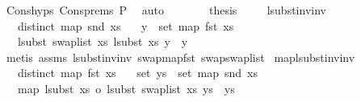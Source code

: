\begin{isabellebody}
\ Cons{\isachardot}{\kern0pt}hyps\ Cons{\isachardot}{\kern0pt}prems{\isacharparenleft}{\kern0pt}{}{\isacharparenright}{\kern0pt}\ P{}\ \isamarkupfalse%
\ auto\isanewline
\ \ \ \ \isamarkupfalse%
\ \isamarkupfalse%
\ {\isacharquery}{\kern0pt}thesis\ \isakeywordONE{{\isachardot}{\kern0pt}}\isamarkupfalse%
\isanewline
\ \ \isamarkupfalse%
\isanewline
{}\isamarkupfalse%
%
\endisatagproof
{\isafoldproof}%
%
\isadelimproof
\isanewline
%
\endisadelimproof
\isanewline
{}\isamarkupfalse%
\ lsubst{\isacharunderscore}{\kern0pt}inv{\isacharunderscore}{\kern0pt}inv{}{\isacharcolon}{\kern0pt}\isanewline
\ \ \ {\isachardoublequoteopen}distinct\ {\isacharparenleft}{\kern0pt}map\ snd\ xs{\isacharparenright}{\kern0pt}{\isachardoublequoteclose}\isanewline
\ \ \ {\isachardoublequoteopen}y\ {\isasymin}\ set\ {\isacharparenleft}{\kern0pt}map\ fst\ xs{\isacharparenright}{\kern0pt}{\isachardoublequoteclose}\isanewline
\ \ \ {\isachardoublequoteopen}lsubst\ {\isacharparenleft}{\kern0pt}swap{\isacharunderscore}{\kern0pt}list\ xs{\isacharparenright}{\kern0pt}\ {\isacharparenleft}{\kern0pt}lsubst\ xs\ y{\isacharparenright}{\kern0pt}\ {\isacharequal}{\kern0pt}\ y{\isachardoublequoteclose}\isanewline
%
\isadelimproof
%
\endisadelimproof
%
\isatagproof
{}\isamarkupfalse%
\ {\isacharparenleft}{\kern0pt}metis\ assms{\isacharparenleft}{\kern0pt}{}{\isacharcomma}{\kern0pt}{}{\isacharparenright}{\kern0pt}\ lsubst{\isacharunderscore}{\kern0pt}inv{\isacharunderscore}{\kern0pt}inv\ swap{\isacharunderscore}{\kern0pt}map{\isacharunderscore}{\kern0pt}fst\ swap{\isacharunderscore}{\kern0pt}swap{\isacharunderscore}{\kern0pt}list{\isacharparenright}{\kern0pt}%
\endisatagproof
{\isafoldproof}%
%
\isadelimproof
\isanewline
%
\endisadelimproof
\isanewline
\isanewline
{}\isamarkupfalse%
\ map{\isacharunderscore}{\kern0pt}lsubst{\isacharunderscore}{\kern0pt}inv{\isacharunderscore}{\kern0pt}inv{\isacharcolon}{\kern0pt}\isanewline
\ \ \ {\isachardoublequoteopen}distinct\ {\isacharparenleft}{\kern0pt}map\ fst\ xs{\isacharparenright}{\kern0pt}{\isachardoublequoteclose}\isanewline
\ \ \ {\isachardoublequoteopen}set\ ys\ {\isasymsubseteq}\ set\ {\isacharparenleft}{\kern0pt}map\ snd\ xs{\isacharparenright}{\kern0pt}{\isachardoublequoteclose}\isanewline
\ \ \ {\isachardoublequoteopen}map\ {\isacharparenleft}{\kern0pt}lsubst\ xs\ o\ lsubst\ {\isacharparenleft}{\kern0pt}swap{\isacharunderscore}{\kern0pt}list\ xs{\isacharparenright}{\kern0pt}{\isacharparenright}{\kern0pt}\ ys\ {\isacharequal}{\kern0pt}\ ys{\isachardoublequoteclose}\isanewline

\end{isabellebody}
